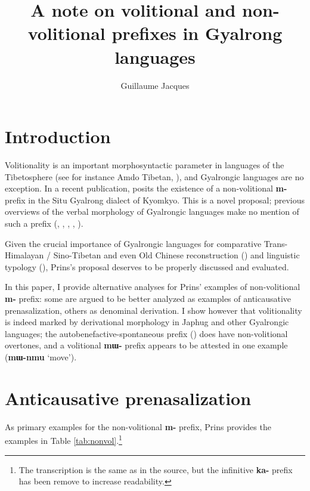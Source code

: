 \documentclass[oneside,a4paper,11pt]{article}
\newcommand{\ipa}[1]{\textbf{{\phon\mbox{#1}}}} %
\begin{document}
\title{A note on volitional and non-volitional prefixes in Gyalrong languages}
\author{Guillaume Jacques}
\maketitle

\section*{Introduction}
Volitionality is an important morphosyntactic parameter in languages of the Tibetosphere (see for instance Amdo Tibetan, \citealt[960-3]{sun93evidentiality}), and Gyalrongic languages are no exception. In a recent publication, \citet[505-6]{prins16kyomkyo} posits the existence of a non-volitional \ipa{m-} prefix in the Situ Gyalrong dialect of Kyomkyo. This is a novel proposal; previous overviews of the verbal  morphology of Gyalrongic languages make no mention of such a prefix (\citealt{jackson03caodeng}, \citealt{jackson06paisheng}, \citealt{jacques12demotion}, \citealt{lai13affixale} \citealt{jackson14morpho},  \citealt{jacques17sketch}).

Given the crucial importance of Gyalrongic languages for comparative Trans-Himalayan / Sino-Tibetan and even Old Chinese reconstruction (\citealt{gong17xingtaixue, gong17clusters}) and linguistic typology (\citealt{jacques13harmonization, jacques14antipassive}), Prins's proposal deserves to be properly discussed and  evaluated.

In this paper, I provide alternative analyses for Prins' examples of non-volitional \ipa{m-} prefix: some are argued to be better analyzed as examples of anticausative prenasalization, others as denominal derivation. I show however that volitionality is indeed marked by derivational morphology in Japhug and other Gyalrongic languages; the autobenefactive-spontaneous prefix (\citealt{jacques16japhug}) does have non-volitional overtones, and a volitional \ipa{mɯ-} prefix appears to be attested in one example (\ipa{mɯ-nmu} `move').

\section{Anticausative prenasalization}
As primary examples for the non-volitional \ipa{m-} prefix, Prins provides the examples in Table \ref{tab:nonvol}.\footnote{The transcription is the same as in the source, but the infinitive \ipa{ka-} prefix has been remove to increase readability.}
\end{document}
